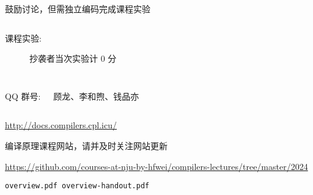 \begin{frame}
  \begin{center}
    鼓励讨论，但需独立编码完成课程实验
  \end{center}

  \begin{columns}
    \begin{description}
      \item[课程实验:] 抄袭者当次实验计 $0$ 分
    \end{description}
  \end{columns}
\end{frame}

\begin{frame}{}
  \begin{columns}
    \begin{center}
      QQ 群号: 

    \end{center}
    \begin{center}
      {\bf {}} 顾龙、李和煦、钱品亦
    \end{center}
  \end{columns}
\end{frame}

\begin{frame}{}
  \begin{center}
    \url{http://docs.compilers.cpl.icu/} \\[5pt]


    编译原理课程网站，请并及时关注网站更新
  \end{center}
\end{frame}

\begin{frame}{}
  \begin{center}

    \vspace{0.50cm}
    \url{https://github.com/courses-at-nju-by-hfwei/compilers-lectures/tree/master/2024}

    \vspace{0.50cm}
    \texttt{overview.pdf \qquad overview-handout.pdf}
  \end{center}
\end{frame}

